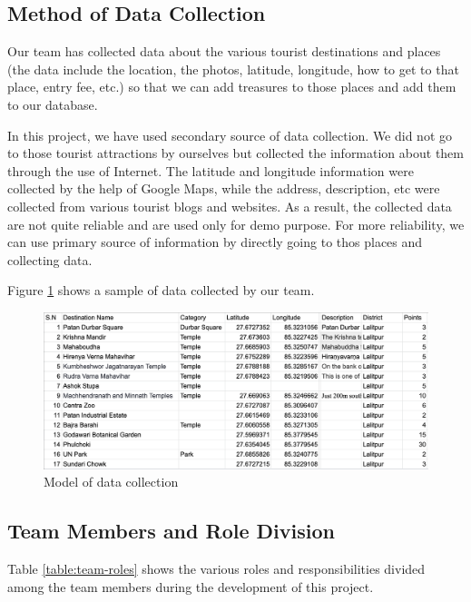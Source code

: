 \documentclass[12pt, a4paper, oneside]{article}
\begin{document}
\subsection{Method of Data Collection}
Our team has collected data about the various tourist destinations and places (the data include the location, the photos, latitude, longitude, how to get to that place, entry fee, etc.) so that we can add treasures to those places and add them to our database.

In this project, we have used secondary source of data collection. We did not go to those tourist attractions by ourselves but collected the information about them through the use of Internet. The latitude and longitude information were collected by the help of Google Maps, while the address, description, etc were collected from various tourist blogs and websites. As a result, the collected data are not quite reliable and are used only for demo purpose. For more reliability, we can use primary source of information by directly going to thos places and collecting data.

Figure \ref{fig:data-model} shows a sample of data collected by our team.

\begin{figure}[H]
\includegraphics[width=\linewidth, keepaspectratio]{screenshots/data-collection.png}
\centering
\caption{Model of data collection}
\label{fig:data-model}
\end{figure}


\subsection{Team Members and Role Division}
Table \ref{table:team-roles} shows the various roles and responsibilities divided among the team members during the development of this project.
\end{document}
